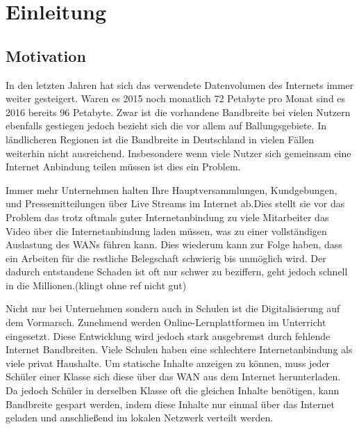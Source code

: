 \chapter{Einleitung}\label{ch:introduction}


%

\section{Motivation}
In den letzten Jahren hat sich das verwendete Datenvolumen des Internets immer weiter gesteigert. Waren es 2015 noch monatlich 72 Petabyte pro Monat sind es 2016 bereits 96 Petabyte. Zwar ist die vorhandene Bandbreite bei vielen Nutzern ebenfalls gestiegen jedoch bezieht sich die vor allem auf Ballungsgebiete. In ländlicheren Regionen ist die Bandbreite in Deutschland in vielen Fällen weiterhin nicht ausreichend. Insbesondere wenn viele Nutzer sich gemeinsam eine Internet Anbindung teilen müssen ist dies ein Problem.\study

Immer mehr Unternehmen halten Ihre Hauptversammlungen, Kundgebungen, und Pressemitteilungen über Live Streams im Internet ab.\study Dies stellt sie vor das Problem das trotz oftmals guter Internetanbindung zu viele Mitarbeiter das Video über die Internetanbindung laden müssen, was zu einer vollständigen Auslastung des WANs führen kann. Dies wiederum kann zur Folge haben, dass ein Arbeiten für die restliche Belegschaft schwierig bis unmöglich wird. Der dadurch entstandene Schaden ist oft nur schwer zu beziffern, geht jedoch schnell in die Millionen.(klingt ohne ref nicht gut)\study

Nicht nur bei Unternehmen sondern auch in Schulen ist die Digitalisierung auf dem Vormarsch. Zunehmend werden Online-Lernplattformen im Unterricht eingesetzt. Diese Entwicklung wird jedoch stark ausgebremst durch fehlende Internet Bandbreiten. Viele Schulen haben eine schlechtere Internetanbindung als viele privat Haushalte. Um statische Inhalte anzeigen zu können, muss jeder Schüler einer Klasse sich diese über das WAN aus dem Internet herunterladen. Da jedoch Schüler in derselben Klasse oft die gleichen Inhalte benötigen, kann Bandbreite gespart werden, indem diese Inhalte nur einmal über das Internet geladen und anschließend im lokalen Netzwerk verteilt werden.

